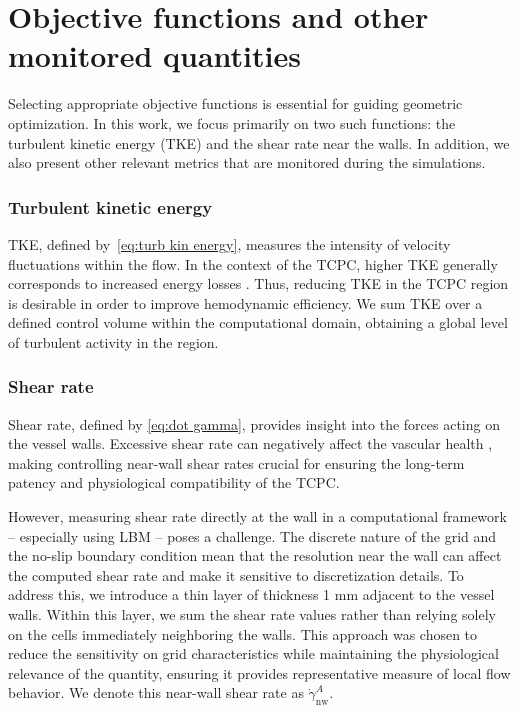 \section{Objective functions and other monitored quantities}\label{objective funcs meaning}
Selecting appropriate objective functions is essential for guiding geometric optimization. In this work, we focus primarily on two such functions: the turbulent kinetic energy (TKE) and the shear rate near the walls. In addition, we also present other relevant metrics that are monitored during the simulations.

\subsubsection*{Turbulent kinetic energy}
TKE, defined by~\eqref{eq:turb kin energy}, measures the intensity of velocity fluctuations within the flow. In the context of the TCPC, higher TKE generally corresponds to increased energy losses \cite{Rijnberg2018}. Thus, reducing TKE in the TCPC region is desirable in order to improve hemodynamic efficiency. We sum TKE over a defined control volume within the computational domain, obtaining a global level of turbulent activity in the region. 

\subsubsection*{Shear rate}
Shear rate, defined by \eqref{eq:dot gamma}, provides insight into the forces acting on the vessel walls. Excessive shear rate can negatively affect the vascular health \cite{Sakariassen2015}, making controlling near-wall shear rates crucial for ensuring the long-term patency and physiological compatibility of the TCPC.

However, measuring shear rate directly at the wall in a computational framework -- especially using LBM -- poses a challenge. The discrete nature of the grid and the no-slip boundary condition mean that the resolution near the wall can affect the computed shear rate and make it sensitive to discretization details. To address this, we introduce a thin layer of thickness 1 mm adjacent to the vessel walls. Within this layer, we sum the shear rate values rather than relying solely on the cells immediately neighboring the walls. This approach was chosen to reduce the sensitivity on grid characteristics while maintaining the physiological relevance of the quantity, ensuring it provides representative measure of local flow behavior. We denote this near-wall shear rate as $\dot{\gamma}^{A}_{\mathrm{nw}}$.

